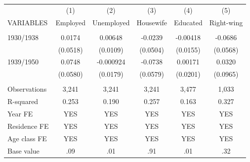 \begin{tabular}{lccccc} \hline
 & (1) & (2) & (3) & (4) & (5) \\
VARIABLES & Employed & Unemployed & Housewife & Educated & Right-wing \\ \hline
 &  &  &  &  &  \\
1930/1938 & 0.0174 & 0.00648 & -0.0239 & -0.00418 & -0.0686 \\
 & (0.0518) & (0.0109) & (0.0504) & (0.0155) & (0.0568) \\
1939/1950 & 0.0748 & -0.000924 & -0.0738 & 0.00171 & 0.0320 \\
 & (0.0580) & (0.0179) & (0.0579) & (0.0201) & (0.0965) \\
 &  &  &  &  &  \\
Observations & 3,241 & 3,241 & 3,241 & 3,477 & 1,033 \\
R-squared & 0.253 & 0.190 & 0.257 & 0.163 & 0.327 \\
Year FE & YES & YES & YES & YES & YES \\
Residence FE & YES & YES & YES & YES & YES \\
Age class FE & YES & YES & YES & YES & YES \\
 Base value & .09 & .01 & .91 & .01 & .32 \\ \hline
\end{tabular}
